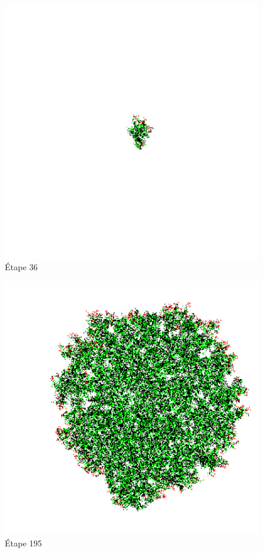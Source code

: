 \documentclass{article}
\begin{document}
\begin{figure}[hbtp]
\centering
\includegraphics[scale=0.22]{Frame-36.png}
\caption{Étape 36}
\end{figure}

\begin{figure}[hbtp]
\centering
\includegraphics[scale=0.22]{Frame-195.png}
\caption{Étape 195}
\end{figure}
\end{document}
